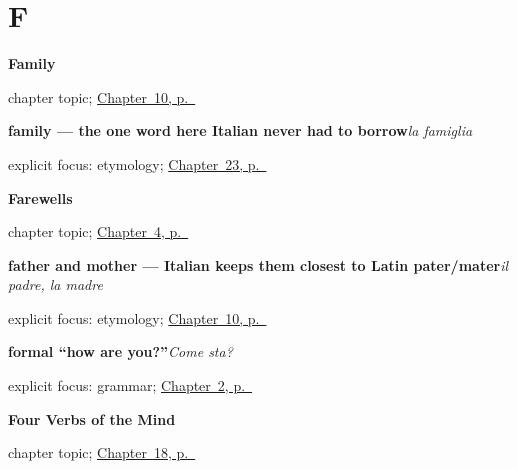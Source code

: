 \section*{F}

\noindent\begin{minipage}[t]{\linewidth}
\raggedright
\textbf{Family}\par
\footnotesize chapter topic; \hyperref[ch:it-family]{Chapter~10, p.~\pageref*{ch:it-family}}
\end{minipage}\par\smallskip

\noindent\begin{minipage}[t]{\linewidth}
\raggedright
\textbf{family — the one word here Italian never had to borrow}\enspace\emph{la famiglia}\par
\footnotesize explicit focus: etymology; \hyperref[ch:it-friends-family-name]{Chapter~23, p.~\pageref*{ch:it-friends-family-name}}
\end{minipage}\par\smallskip

\noindent\begin{minipage}[t]{\linewidth}
\raggedright
\textbf{Farewells}\par
\footnotesize chapter topic; \hyperref[ch:it-farewells]{Chapter~4, p.~\pageref*{ch:it-farewells}}
\end{minipage}\par\smallskip

\noindent\begin{minipage}[t]{\linewidth}
\raggedright
\textbf{father and mother — Italian keeps them closest to Latin pater/mater}\enspace\emph{il padre, la madre}\par
\footnotesize explicit focus: etymology; \hyperref[ch:it-family]{Chapter~10, p.~\pageref*{ch:it-family}}
\end{minipage}\par\smallskip

\noindent\begin{minipage}[t]{\linewidth}
\raggedright
\textbf{formal “how are you?”}\enspace\emph{Come sta?}\par
\footnotesize explicit focus: grammar; \hyperref[ch:it-how-are-you]{Chapter~2, p.~\pageref*{ch:it-how-are-you}}
\end{minipage}\par\smallskip

\noindent\begin{minipage}[t]{\linewidth}
\raggedright
\textbf{Four Verbs of the Mind}\par
\footnotesize chapter topic; \hyperref[ch:it-mind-verbs]{Chapter~18, p.~\pageref*{ch:it-mind-verbs}}
\end{minipage}\par\smallskip

